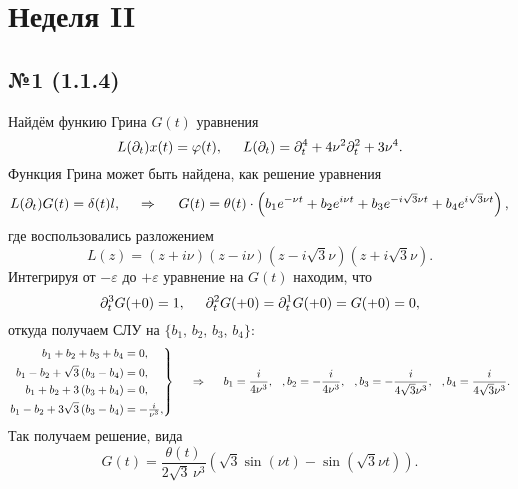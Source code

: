
\section{Неделя II}

\subsection*{№1 (1.1.4)}

Найдём функию Грина $G(t)$ уравнения
\begin{equation*}
    L(\partial_t) x(t) = \varphi(t),
    \hspace{5 mm} 
    L(\partial_t) = \partial_t^4 + 4 \nu^2 \partial_t^2 + 3 \nu^4.
\end{equation*}
Функция Грина может быть найдена, как решение уравнения
\begin{equation*}
    L(\partial_t) G(t) = \delta(t)l,
    \hspace{0.5cm} \Rightarrow \hspace{0.5cm} 
    G(t) = \theta(t) \cdot \left(b_1 e^{-\nu t} + b_2 e^{i \nu t} + b_3 e^{- i \sqrt{3} \nu t} + b_4 e^{i \sqrt{3} \nu t}\right),
\end{equation*}
где воспользовались разложением
\begin{equation*}
    L(z) = (z + i \nu) (z- i \nu) (z - i \sqrt{3} \nu) (z + i \sqrt{3} \nu).
\end{equation*}
Интегрируя от $-\varepsilon$ до $+\varepsilon$ уравнение на $G(t)$ находим, что
\begin{equation*}
    \partial_t^3 G(+0)  = 1, \hspace{5 mm} \partial_t^2 G(+0) = \partial_t^1 G(+0) = G(+0) = 0,
\end{equation*}
откуда получаем СЛУ на $\{b_1,\, b_2,\, b_3,\, b_4\}$:
\begin{equation*}
    \left.\begin{aligned}
        b_1+b_2+b_3+b_4 &=0, \\ 
        b_1-b_2+\sqrt{3} \left(b_3-b_4\right)  &=0, \\
        b_1+b_2+3 \left(b_3+b_4\right)  &=0, \\
        b_1-b_2+3 \sqrt{3} \left(b_3-b_4\right)  &=-\tfrac{i}{ \nu^3}, \\
    \end{aligned}\right\}
    \hspace{0.5cm} \Rightarrow \hspace{0.5cm}
    b_1 = \frac{i}{4 \nu^3}, \hspace{2.5 mm}, 
    b_2 = -\frac{i}{4 \nu^3}, \hspace{2.5 mm},
    b_3 = -\frac{i}{4 \sqrt{3} \nu^3}, \hspace{2.5 mm},
    b_4 = \frac{i}{4 \sqrt{3} \nu^3}.
\end{equation*}
Так получаем решение, вида
\begin{equation*}
    G(t) = \frac{\theta(t)}{2 \sqrt{3}\,  \nu^3} \left(
        \sqrt{3}  \sin(\nu t) - \sin(\sqrt{3} \nu t)
    \right).
\end{equation*}






